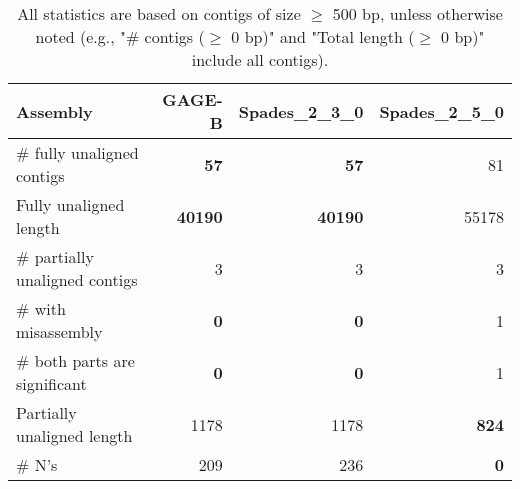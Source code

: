 \documentclass[12pt,a4paper]{article}
\begin{document}
\begin{table}[ht]
\begin{center}
\caption{All statistics are based on contigs of size $\geq$ 500 bp, unless otherwise noted (e.g., "\# contigs ($\geq$ 0 bp)" and "Total length ($\geq$ 0 bp)" include all contigs).}
\begin{tabular}{|l*{3}{|r}|}
\hline
Assembly & GAGE-B & Spades\_2\_3\_0 & Spades\_2\_5\_0 \\ \hline
\# fully unaligned contigs & {\bf 57} & {\bf 57} & 81 \\ \hline
Fully unaligned length & {\bf 40190} & {\bf 40190} & 55178 \\ \hline
\# partially unaligned contigs & 3 & 3 & 3 \\ \hline
\hspace{5mm}\# with misassembly & {\bf 0} & {\bf 0} & 1 \\ \hline
\hspace{5mm}\# both parts are significant & {\bf 0} & {\bf 0} & 1 \\ \hline
Partially unaligned length & 1178 & 1178 & {\bf 824} \\ \hline
\# N's & 209 & 236 & {\bf 0} \\ \hline
\end{tabular}
\end{center}
\end{table}
\end{document}

